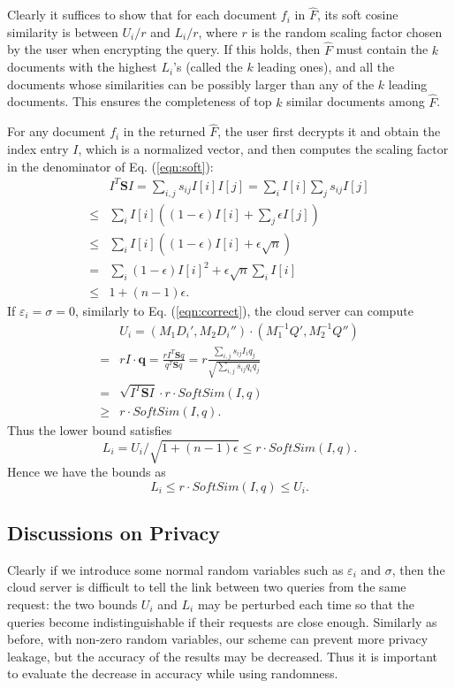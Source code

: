 \documentclass{IEEEtran}
\begin{document}
Clearly it suffices to show that for each document $f_i$ in $\hat{F}$, its soft cosine similarity is between $U_i/r$ and $L_i/r$, where $r$ is the random scaling factor chosen by the user when encrypting the query. If this holds, then $\hat{F}$ must contain the $k$ documents with the highest $L_i$'s (called the $k$ leading ones), and all the documents whose similarities can be possibly larger than any of the $k$ leading documents. This ensures the completeness of top $k$ similar documents among $\hat{F}$.

For any document $f_i$ in the returned $\hat{F}$, the user first decrypts it and obtain the index entry $I$, which is a normalized vector, and then computes the scaling factor in the denominator of Eq. (\ref{eqn:soft}):
$$\begin{aligned}
&I^T \mathbf{S} I = \sum_{i,j} s_{ij} I[i]I[j] 
=\sum_i I[i] \sum_j s_{ij} I[j] \\
\leq & \sum_i I[i] \left( (1-\epsilon)I[i] + \sum_j \epsilon I[j] \right) \\
\leq & \sum_i I[i] \left( (1-\epsilon)I[i] + \epsilon \sqrt{n} \right) \\
=& \sum_i (1-\epsilon)I[i]^2 + \epsilon \sqrt{n} \sum_i I[i] \\
\leq& 1+(n-1)\epsilon.
\end{aligned}$$
If $\varepsilon_i = \sigma = 0$, similarly to Eq. (\ref{eqn:correct}), the cloud server can compute 
$$\begin{aligned}
&U_i = (M_1D_i', M_2D_i'')\cdot(M_1^{-1}Q', M_2^{-1}Q'') \\
=&rI\cdot \mathbf{q} = \frac{rI^T\mathbf{S}q}{q^T\mathbf{S}q} 
=r\frac{\sum_{i,j}s_{ij}I_iq_j}{\sqrt{\sum_{i,j}s_{ij}q_iq_j}}\\
=&\sqrt{I^T \mathbf{S} I}\cdot r\cdot SoftSim(I,q)\\
\geq& r\cdot SoftSim(I,q).
\end{aligned}$$
Thus the lower bound satisfies
$$L_i = U_i/\sqrt{1+(n-1)\epsilon} \leq r\cdot SoftSim(I,q).$$
Hence we have the bounds as
$$L_i \leq r\cdot SoftSim(I,q)\leq U_i.$$

\subsection{Discussions on Privacy}
Clearly if we introduce some normal random variables such as $\varepsilon_i$ and $\sigma$, then the cloud server is difficult to tell the link between two queries from the same request: the two bounds $U_i$ and $L_i$ may be perturbed each time so that the queries become indistinguishable if their requests are close enough. Similarly as before, with non-zero random variables, our scheme can prevent more privacy leakage, but the accuracy of the results may be decreased. Thus it is important to evaluate the decrease in accuracy while using randomness.



\end{document}
